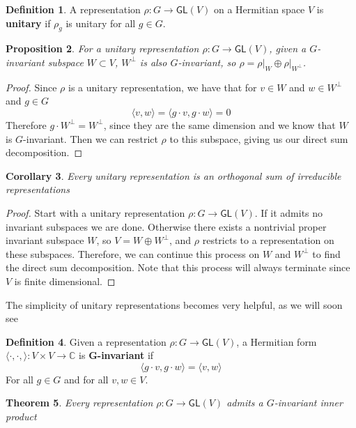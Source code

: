 \documentclass[psamsfonts]{amsart}
\newtheorem{thm}{Theorem}[section]
\newtheorem{cor}[thm]{Corollary}
\newtheorem{prop}[thm]{Proposition}
\theoremstyle{definition}
\newtheorem{defn}[thm]{Definition}
\theoremstyle{remark}
\newcommand{\C}{\mathbb{C}}
\newcommand{\GL}{\mathsf{GL}}
\begin{document}
\begin{defn}
A representation $\rho: G\to \GL(V)$ on a Hermitian space $V$ is \textbf{unitary} if $\rho_g$ is unitary for all $g \in G$.
\end{defn}

\begin{prop}
For a unitary representation $\rho: G \to \GL(V)$, given a $G$-invariant subspace $W \subset V$, $W^\perp$ is also $G$-invariant, so $\rho = \rho\big\vert_W \oplus \rho\big\vert_{W^\perp}$.
\end{prop}

\begin{proof}
Since $\rho$ is a unitary representation, we have that for $v \in W$ and $w \in W^\perp$ and $g \in G$
$$\langle v, w \rangle = \langle g\cdot v, g \cdot w \rangle = 0$$
Therefore $g \cdot W^\perp = W^\perp$, since they are the same dimension and we know that $W$ is $G$-invariant. Then we can restrict $\rho$ to this subspace, giving us our direct sum decomposition.
\end{proof}

\begin{cor}
Every unitary representation is an orthogonal sum of irreducible representations
\end{cor}

\begin{proof}
Start with a unitary representation $\rho: G \to \GL(V)$. If it admits no invariant subspaces we are done. Otherwise there exists a nontrivial proper invariant subspace $W$, so $V = W \oplus W^\perp$, and $\rho$ restricts to a representation on these subspaces. Therefore, we can continue this process on $W$ and $W^\perp$ to find the direct sum decomposition. Note that this process will always terminate since $V$ is finite dimensional.
\end{proof}

The simplicity of unitary representations becomes very helpful, as we will soon see

\begin{defn}
Given a representation $\rho: G \to \GL(V)$, a Hermitian form $\langle \cdot, \cdot, \rangle: V\times V \to \C$ is \textbf{G-invariant} if
$$\langle g\cdot v, g\cdot w \rangle = \langle v,w \rangle $$
For all $g\in G$ and for all $v,w \in V$.
\end{defn}

\begin{thm}
Every representation $\rho: G\to \GL(V)$ admits a $G$-invariant inner product
\end{thm}
\end{document}
